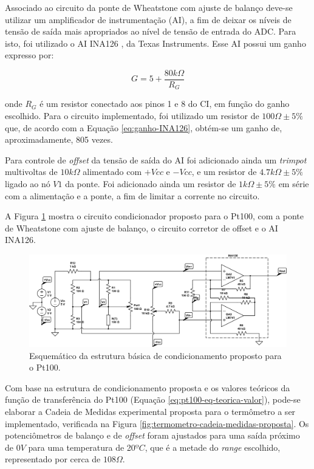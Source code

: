 \documentclass[a4paper]{instrumentacao}
\begin{document}
Associado ao circuito da ponte de Wheatstone com ajuste de balanço deve-se utilizar um amplificador de instrumentação (AI), a fim de deixar os níveis de tensão de saída mais apropriados ao nível de tensão de entrada do ADC. Para isto, foi utilizado o AI INA126 \cite{datasheet-INA126}, da Texas Instruments. Esse AI possui um ganho expresso por:

 \begin{equation}
	G=5+\frac{80k\Omega}{R_G}
	\label{eq:ganho-INA126}
\end{equation}

\noindent onde $R_G$ é um resistor conectado aos pinos 1 e 8 do CI, em função do ganho escolhido. Para o circuito implementado, foi utilizado um resistor de $100\Omega\pm5\%$ que, de acordo com a Equação \ref{eq:ganho-INA126}, obtém-se um ganho de, aproximadamente, 805 vezes.

Para controle de \textit{offset} da tensão de saída do AI foi adicionado ainda um \textit{trimpot} multivoltas de $10k\Omega$ alimentado com $+Vcc$ e $-Vcc$, e um resistor de $4.7k\Omega\pm5\%$ ligado ao nó $V1$ da ponte. Foi adicionado ainda um resistor de $1k\Omega\pm5\%$ em série com a alimentação e a ponte, a fim de limitar a corrente no circuito.

A Figura \ref{fig:termometro-ckt-condicionador-completo} mostra o circuito condicionador proposto para o Pt100, com a ponte de Wheatstone com ajuste de balanço, o circuito corretor de offset e o AI INA126.

\begin{figure}[H]
	\centering \includegraphics[width=\textwidth]{pt100-condicionamento-completo.png}
	\caption{Esquemático da estrutura básica de condicionamento proposto para o Pt100.}
	\label{fig:termometro-ckt-condicionador-completo}
\end{figure}

Com base na estrutura de condicionamento proposta e os valores teóricos da função de transferência do Pt100 (Equação \ref{eq:pt100-eq-teorica-valor}), pode-se elaborar a Cadeia de Medidas experimental proposta para o termômetro a ser implementado, verificada na Figura \ref{fig:termometro-cadeia-medidas-proposta}. Os potenciômetros de balanço e de \textit{offset} foram ajustados para uma saída próximo de $0V$ para uma temperatura de 20$ºC$, que é a metade do \textit{range} escolhido, representado por cerca de $108\Omega$.
\end{document}

